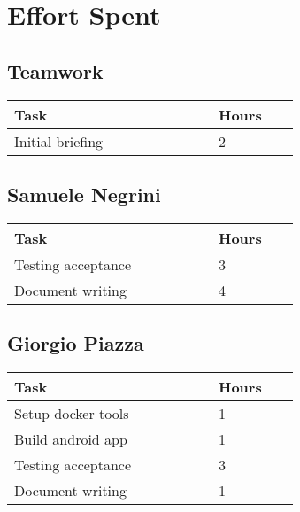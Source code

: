 \chapter{Effort Spent}

\section{Teamwork}
\vspace{2mm}
\begin{center}
    \begin{tabular}{@{}p{0.5\linewidth} p{0.2\linewidth}@{}}
        \hline
        \textbf{Task} & \textbf{Hours} \\ \hline
        Initial briefing & 2 \\ \hline
    \end{tabular}
\end{center}

\section{Samuele Negrini}
\vspace{2mm}
\begin{center}
	\begin{tabular}{@{}p{0.5\linewidth} p{0.2\linewidth}@{}}
		\hline
		\textbf{Task} & \textbf{Hours} \\ \hline
		Testing acceptance & 3 \\ \hline
	    Document writing & 4 \\ \hline
	\end{tabular}
\end{center}

\section{Giorgio Piazza}
\vspace{2mm}
\begin{center}
	\begin{tabular}{@{}p{0.5\linewidth} p{0.2\linewidth}@{}}
		\hline
		\textbf{Task} & \textbf{Hours} \\ \hline
		Setup docker tools & 1 \\ \hline
		Build android app & 1 \\ \hline
		Testing acceptance & 3 \\ \hline
		Document writing & 1 \\ \hline
	\end{tabular}
\end{center}